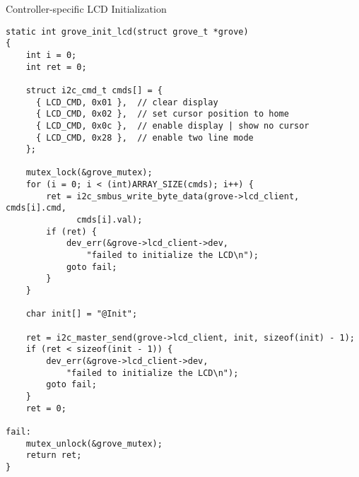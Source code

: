 \begin{listing} [H]
    \caption{Controller-specific LCD Initialization}
    \label{lst:probe-lcdinit}
    \begin{verbatim}
static int grove_init_lcd(struct grove_t *grove)
{
    int i = 0;
    int ret = 0;

    struct i2c_cmd_t cmds[] = {
      { LCD_CMD, 0x01 },  // clear display
      { LCD_CMD, 0x02 },  // set cursor position to home
      { LCD_CMD, 0x0c },  // enable display | show no cursor
      { LCD_CMD, 0x28 },  // enable two line mode
    };

    mutex_lock(&grove_mutex);
    for (i = 0; i < (int)ARRAY_SIZE(cmds); i++) {
        ret = i2c_smbus_write_byte_data(grove->lcd_client, cmds[i].cmd,
              cmds[i].val);
        if (ret) {
            dev_err(&grove->lcd_client->dev,
                "failed to initialize the LCD\n");
            goto fail;
        }
    }

    char init[] = "@Init";

    ret = i2c_master_send(grove->lcd_client, init, sizeof(init) - 1);
    if (ret < sizeof(init - 1)) {
        dev_err(&grove->lcd_client->dev,
            "failed to initialize the LCD\n");
        goto fail;
    }
    ret = 0;

fail:
    mutex_unlock(&grove_mutex);
    return ret;
}
    \end{verbatim}
\end{listing}

